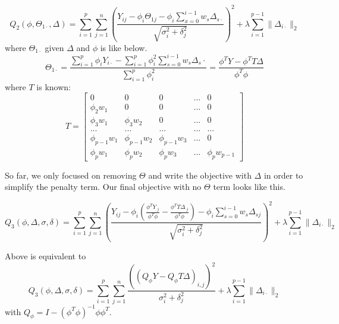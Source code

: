 \documentclass[11pt]{article}
\begin{document}
\begin{equation}
Q_2(\phi, \Theta_{1\cdot}, \Delta) = 
\sum_{i=1}^{p} \sum_{j=1}^{n} \left(
\frac{
Y_{ij}-\phi_i \Theta_{1j} - \phi_i \sum_{x=0}^{i-1} w_s \Delta_{s\cdot}
}{
\sqrt{\sigma_i^2 + \delta_j^2}
}\right)^2 
 + \lambda \sum_{i=1}^{p-1} \| \Delta_{i \cdot} \| _2
\end{equation}
\noindent where $\Theta_{1\cdot}$ given $\Delta$ and $\phi$ is like below.
\begin{equation}
\Theta_{1\cdot} = \frac{
\sum_{i=1}^{p} \phi_i Y_{i\cdot} - \sum_{i=1}^{p} \phi_i^2 \sum_{s=0}^{i-1} w_s \Delta_s{\cdot}
}
{\sum_{i=1}^{p} \phi_i^2}
=
\frac{\phi^T Y - \phi^T T \Delta}{\phi^T \phi}
\end{equation}
\noindent where $T$ is known:
$$T=\begin{bmatrix}
0 & 0 & 0 & ... &0\\
\phi_2 w_1 & 0 & 0 & ... & 0\\
\phi_3  w_1 & \phi_3 w_2 & 0 & ... & 0\\
... & ... & ... & ... & ...\\
\phi_{p-1} w_1 & \phi_{p-1} w_2 & \phi_{p-1}w_3 & ... & 0\\
\phi_p w_1 & \phi_p w_2 & \phi_p w_3 & ... & \phi_p w_{p-1}
\end{bmatrix}
$$

\noindent So far, we only focused on removing $\Theta$ and write the objective with $\Delta$ in order to simplify the penalty term. Our final objective with no $\Theta$ term looks like this.

\begin{equation}
Q_3(\phi, \Delta, \sigma, \delta) = 
\sum_{i=1}^{p} \sum_{j=1}^{n}
\left(
\frac{
Y_{ij} - \phi_i 
\left(   \frac{\phi^TY_{\cdot j}}{\phi^T \phi} - \frac{\phi^T T \Delta_{\cdot j}}{\phi^T \phi}
  \right)
- \phi_i \sum_{s=0}^{i-1} w_s \Delta_{sj}
}
{
\sqrt{\sigma_i^2 + \delta_j^2}
}
\right)^2
 + \lambda \sum_{i=1}^{p-1} \| \Delta_{i\cdot}\|_2
\end{equation}

\noindent Above is equivalent to 
\begin{equation}
Q_3(\phi, \Delta, \sigma, \delta) = \sum_{i=1}^{p} \sum_{j=1}^{n} \frac{ \left((Q_{\phi}Y - Q_{\phi} T \Delta)_{i,j}\right)^2}{\sigma_i^2 + \delta_j^2} + \lambda \sum_{i=1}^{p-1} \|\Delta_{i \cdot}\|_2
\end{equation}
\noindent with $Q_{\phi} = I-(\phi^T\phi)^{-1} \phi \phi^T$.\\
\end{document}
